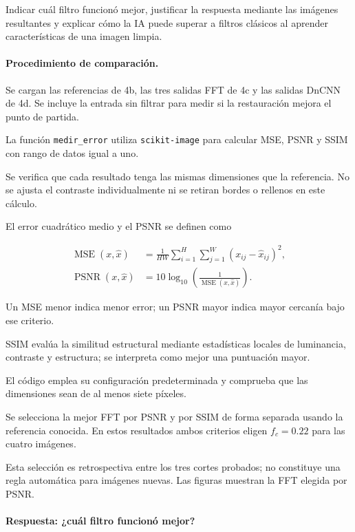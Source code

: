 \documentclass[11pt]{article}
\begin{document}
Indicar cuál filtro funcionó mejor, justificar la respuesta
mediante las imágenes resultantes y explicar cómo la IA
puede superar a filtros clásicos al aprender características
de una imagen limpia.

\paragraph{Procedimiento de comparación.}

Se cargan las referencias de 4b, las tres salidas FFT de 4c
y las salidas DnCNN de 4d. Se incluye la entrada sin filtrar
para medir si la restauración mejora el punto de partida.

La función \texttt{medir\_error} utiliza
\texttt{scikit-image} para calcular MSE, PSNR y SSIM
con rango de datos igual a uno.

Se verifica que cada resultado tenga las mismas dimensiones
que la referencia. No se ajusta el contraste individualmente
ni se retiran bordes o rellenos en este cálculo.

El error cuadrático medio y el PSNR se definen como

\begin{align}
 \operatorname{MSE}(x,\widehat{x})
 &=
 \frac{1}{HW}
 \sum_{i=1}^{H}
 \sum_{j=1}^{W}
 (x_{ij}-\widehat{x}_{ij})^2,
 \\
 \operatorname{PSNR}(x,\widehat{x})
 &=
 10\log_{10}\!
 \left(
    \frac{1}{\operatorname{MSE}(x,\widehat{x})}
 \right).
\end{align}

Un MSE menor indica menor error; un PSNR mayor indica mayor
cercanía bajo ese criterio.

SSIM evalúa la similitud estructural mediante estadísticas
locales de luminancia, contraste y estructura; se interpreta
como mejor una puntuación mayor.

El código emplea su configuración predeterminada y comprueba
que las dimensiones sean de al menos siete píxeles.

Se selecciona la mejor FFT por PSNR y por SSIM de forma
separada usando la referencia conocida. En estos resultados
ambos criterios eligen $f_c=0.22$ para las cuatro imágenes.

Esta selección es retrospectiva entre los tres cortes
probados; no constituye una regla automática para imágenes
nuevas. Las figuras muestran la FFT elegida por PSNR.

\paragraph{Respuesta: ¿cuál filtro funcionó mejor?}
\end{document}
